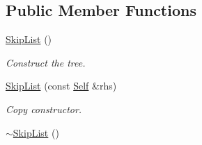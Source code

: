 \subsection*{Public Member Functions}
\begin{CompactItemize}
\item 
\hyperlink{classSkipList_3_01ValueType_00_01KeyType_00_01MAX__GAP_00_01MemStorage_00_01LockType_01_4_625716dcaac1e6d5250135d0ed008f48}{SkipList} ()
\begin{CompactList}\small\item\em Construct the tree. \item\end{CompactList}\item 
\hyperlink{classSkipList_3_01ValueType_00_01KeyType_00_01MAX__GAP_00_01MemStorage_00_01LockType_01_4_c7c90a05082f010951c52e7c5b508b24}{SkipList} (const \hyperlink{classSkipList_3_01ValueType_00_01KeyType_00_01MAX__GAP_00_01MemStorage_00_01LockType_01_4}{Self} \&rhs)
\begin{CompactList}\small\item\em Copy constructor. \item\end{CompactList}\item 
\hypertarget{classSkipList_3_01ValueType_00_01KeyType_00_01MAX__GAP_00_01MemStorage_00_01LockType_01_4_4a79a8e09210a216dbe459c0b57e301a}{
\hyperlink{classSkipList_3_01ValueType_00_01KeyType_00_01MAX__GAP_00_01MemStorage_00_01LockType_01_4_4a79a8e09210a216dbe459c0b57e301a}{$\sim$SkipList} ()}
\label{classSkipList_3_01ValueType_00_01KeyType_00_01MAX__GAP_00_01MemStorage_00_01LockType_01_4_4a79a8e09210a216dbe459c0b57e301a}


\end{CompactItemize}

